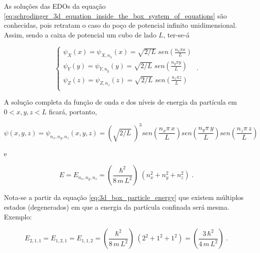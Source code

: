 As soluções das EDOs da equação
\ref{eq:schrodinger_3d_equation_inside_the_box_system_of_equations} são
conhecidas, pois retratam o caso do poço de potencial infinito unidimensional.
Assim, sendo a caixa de potencial um cubo de lado $L$, ter-se-á

\begin{equation}
	\begin{cases}
		\psi_{X}(x)	=	\psi_{X,n_{x}}(x)	= \sqrt{2/L}\;sen(\frac{n_x \pi x}{L}) \\
		\psi_{Y}(y)	=	\psi_{Y,n_{y}}(y)	= \sqrt{2/L}\;sen(\frac{n_y \pi y}{L}) \\
		\psi_{Z}(z)	=	\psi_{Z,n_{z}}(z)	= \sqrt{2/L}\;sen(\frac{n_z \pi z}{L}) \\
	\end{cases}\;.
\end{equation}

A solução completa da função de onda e dos níveis de energia da
partícula em $0<x,y,z<L$ ficará, portanto,

\begin{equation}
	\psi(x,y,z)	= \psi_{n_x,n_y,n_z}(x,y,z) = \left(\sqrt{2/L}\;\right)^3
	sen\left(\frac{n_x \pi \, x}{L}\right)
	sen\left(\frac{n_y \pi \, y}{L}\right)
	sen\left(\frac{n_z \pi \, z}{L}\right)
\end{equation}

\noindent e

\begin{equation}
	E	= E_{n_x,n_y,n_z} =	\left(\frac{\hbar^2}{8\,m\,L^2}\right)\;
	(n_x^2 + n_y^2 + n_z^2)\;.
	\label{eq:3d_box_particle_energy}
\end{equation}

Nota-se a partir da equação \ref{eq:3d_box_particle_energy} que existem
múltiplos estados (degenerados) em que a energia da partícula confinada será
mesma. Exemplo:

\begin{equation}
	E_{2,1,1} =E_{1,2,1} = E_{1,1,2} =
	\left(\frac{\hbar^2}{8\,m\,L^2}\right)\;(2^2 + 1^2 + 1^2) =
	\left(\frac{3\,\hbar^2}{4\,m\,L^2}\right)\;.
\end{equation}

